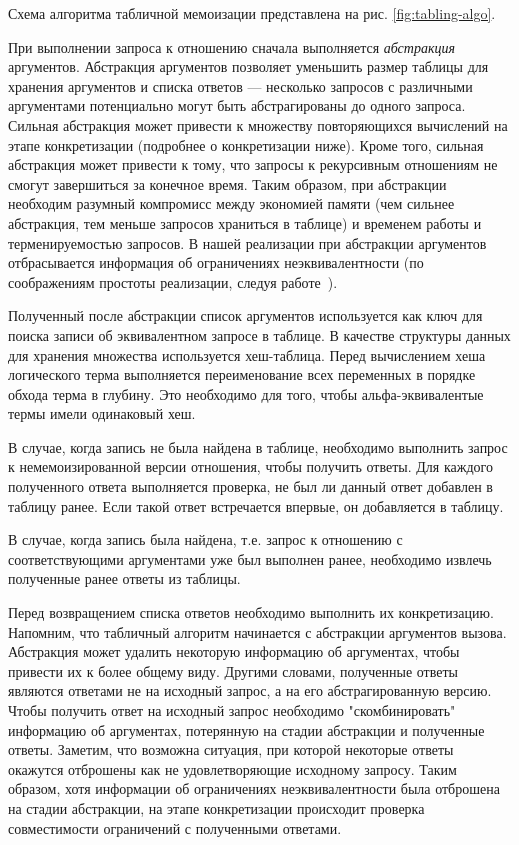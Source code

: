 Схема алгоритма табличной мемоизации представлена на рис. \ref{fig:tabling-algo}.

При выполнении запроса к отношению сначала выполняется \emph{абстракция} аргументов. 
Абстракция аргументов позволяет уменьшить размер таблицы для хранения 
аргументов и списка ответов --- несколько запросов с различными аргументами
потенциально могут быть абстрагированы до одного запроса.
Сильная абстракция может привести 
к множеству повторяющихся вычислений на этапе конкретизации 
(подробнее о конкретизации ниже).
Кроме того, сильная абстракция может привести 
к тому, что запросы к рекурсивным отношениям не смогут завершиться за конечное время.
Таким образом, при абстракции необходим разумный компромисс 
между экономией памяти (чем сильнее абстракция, тем меньше запросов храниться в таблице)
и временем работы и терменируемостью запросов.
В нашей реализации при абстракции аргументов отбрасывается 
информация об ограничениях неэквивалентности
(по соображениям простоты реализации, следуя работе~\cite{schrijvers2008tchr}).

Полученный после абстракции список аргументов используется как ключ
для поиска записи об эквивалентном запросе в таблице. 
В качестве структуры данных для хранения множества используется хеш-таблица. 
Перед вычислением хеша логического терма выполняется переименование 
всех переменных в порядке обхода терма в глубину. 
Это необходимо для того, чтобы альфа-эквивалентые термы имели одинаковый хеш.

В случае, когда запись не была найдена в таблице, 
необходимо выполнить запрос к немемоизированной версии отношения, чтобы получить ответы.
Для каждого полученного ответа выполняется проверка, 
не был ли данный ответ добавлен в таблицу ранее.
Если такой ответ встречается впервые, он добавляется в таблицу.

В случае, когда запись была найдена, т.е. запрос к отношению
с соответствующими аргументами уже был выполнен ранее,
необходимо извлечь полученные ранее ответы из таблицы.

Перед возвращением списка ответов необходимо выполнить их конкретизацию.
Напомним, что табличный алгоритм начинается с абстракции аргументов вызова.
Абстракция может удалить некоторую информацию об аргументах,
чтобы привести их к более общему виду.
Другими словами, полученные ответы являются ответами не на исходный запрос,
а на его абстрагированную версию.
Чтобы получить ответ на исходный запрос необходимо "скомбинировать" информацию об аргументах,
потерянную на стадии абстракции и полученные ответы.
Заметим, что возможна ситуация, при которой некоторые ответы окажутся отброшены
как не удовлетворяющие исходному запросу.
Таким образом, хотя информации об ограничениях неэквивалентности была отброшена на стадии абстракции, 
на этапе конкретизации происходит проверка совместимости ограничений с полученными ответами.


